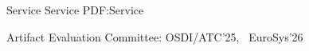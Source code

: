 \Section
{Service}
{Service}
{PDF:Service}

\Entry
Artifact Evaluation Committee: OSDI/ATC'25, ~EuroSys'26